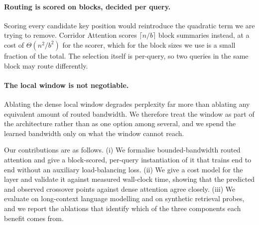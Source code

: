 \paragraph{Routing is scored on blocks, decided per query.} Scoring every
candidate key position would reintroduce the quadratic term we are trying to
remove. Corridor Attention scores $\lceil n / b \rceil$ block summaries
instead, at a cost of $\Theta(n^2 / b^2)$ for the scorer, which for the block
sizes we use is a small fraction of the total. The selection itself is
per-query, so two queries in the same block may route differently.

\paragraph{The local window is not negotiable.} Ablating the dense local
window degrades perplexity far more than ablating any equivalent amount of
routed bandwidth. We therefore treat the window as part of the architecture
rather than as one option among several, and we spend the learned bandwidth
only on what the window cannot reach.

Our contributions are as follows. (i) We formalise bounded-bandwidth routed
attention and give a block-scored, per-query instantiation of it that trains
end to end without an auxiliary load-balancing loss. (ii) We give a cost model
for the layer and validate it against measured wall-clock time, showing that
the predicted and observed crossover points against dense attention agree
closely. (iii) We evaluate on long-context language modelling and on synthetic
retrieval probes, and we report the ablations that identify which of the three
components each benefit comes from.

